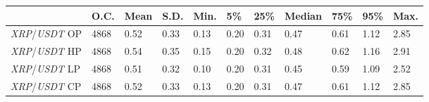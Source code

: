 \begin{tabular}{lllllllllll}
\toprule
 & \textbf{O.C.} & \textbf{Mean} & \textbf{S.D.} & \textbf{Min.} & \textbf{5\%} & \textbf{25\%} & \textbf{Median} & \textbf{75\%} & \textbf{95\%} & \textbf{Max.} \\
\midrule
\emph{XRP}/\emph{USDT} OP & 4868 & 0.52 & 0.33 & 0.13 & 0.20 & 0.31 & 0.47 & 0.61 & 1.12 & 2.85 \\
\emph{XRP}/\emph{USDT} HP & 4868 & 0.54 & 0.35 & 0.15 & 0.20 & 0.32 & 0.48 & 0.62 & 1.16 & 2.91 \\
\emph{XRP}/\emph{USDT} LP & 4868 & 0.51 & 0.32 & 0.10 & 0.20 & 0.31 & 0.45 & 0.59 & 1.09 & 2.52 \\
\emph{XRP}/\emph{USDT} CP & 4868 & 0.52 & 0.33 & 0.13 & 0.20 & 0.31 & 0.47 & 0.61 & 1.12 & 2.85 \\
\bottomrule
\end{tabular}
